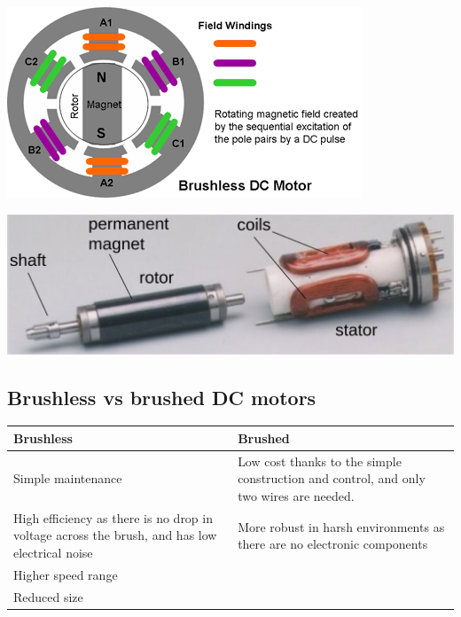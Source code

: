 \documentclass[11pt]{article}
\begin{document}
\begin{center}
\includegraphics[width=.9\linewidth]{./images/brushless-dc-motor-diagram.png}
\end{center}
\begin{center}
\includegraphics[width=.9\linewidth]{./images/brushless-dc-motor.png}
\end{center}

\subsection{Brushless vs brushed DC motors}
\label{sec:orga8cfe52}
\begin{center}
\begin{tabular}{m{16em}|m{16em}}
Brushless & Brushed\\[0pt]
\hline
Simple maintenance & Low cost thanks to the simple construction and control, and only two wires are needed.\\[0pt]
\hline
High efficiency as there is no drop in voltage across the brush, and has low electrical noise & More robust in harsh environments as there are no electronic components\\[0pt]
\hline
Higher speed range & \\[0pt]
\hline
Reduced size & \\[0pt]
\end{tabular}
\end{center}
\end{document}
